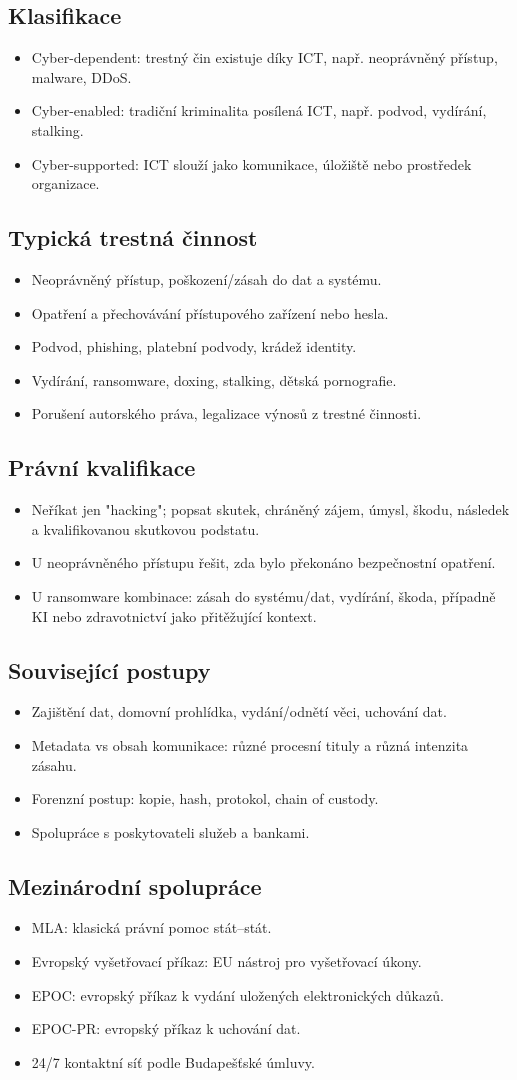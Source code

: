 \documentclass[10pt,a4paper]{article}
\newcommand{\blok}[1]{\subsection*{#1}}
\begin{document}
\blok{Klasifikace}
\begin{itemize}
  \item Cyber-dependent: trestný čin existuje díky ICT, např. neoprávněný přístup, malware, DDoS.
  \item Cyber-enabled: tradiční kriminalita posílená ICT, např. podvod, vydírání, stalking.
  \item Cyber-supported: ICT slouží jako komunikace, úložiště nebo prostředek organizace.
\end{itemize}

\blok{Typická trestná činnost}
\begin{itemize}
  \item Neoprávněný přístup, poškození/zásah do dat a systému.
  \item Opatření a přechovávání přístupového zařízení nebo hesla.
  \item Podvod, phishing, platební podvody, krádež identity.
  \item Vydírání, ransomware, doxing, stalking, dětská pornografie.
  \item Porušení autorského práva, legalizace výnosů z trestné činnosti.
\end{itemize}

\blok{Právní kvalifikace}
\begin{itemize}
  \item Neříkat jen "hacking"; popsat skutek, chráněný zájem, úmysl, škodu, následek a kvalifikovanou skutkovou podstatu.
  \item U neoprávněného přístupu řešit, zda bylo překonáno bezpečnostní opatření.
  \item U ransomware kombinace: zásah do systému/dat, vydírání, škoda, případně KI nebo zdravotnictví jako přitěžující kontext.
\end{itemize}

\blok{Související postupy}
\begin{itemize}
  \item Zajištění dat, domovní prohlídka, vydání/odnětí věci, uchování dat.
  \item Metadata vs obsah komunikace: různé procesní tituly a různá intenzita zásahu.
  \item Forenzní postup: kopie, hash, protokol, chain of custody.
  \item Spolupráce s poskytovateli služeb a bankami.
\end{itemize}

\blok{Mezinárodní spolupráce}
\begin{itemize}
  \item MLA: klasická právní pomoc stát--stát.
  \item Evropský vyšetřovací příkaz: EU nástroj pro vyšetřovací úkony.
  \item EPOC: evropský příkaz k vydání uložených elektronických důkazů.
  \item EPOC-PR: evropský příkaz k uchování dat.
  \item 24/7 kontaktní síť podle Budapešťské úmluvy.
\end{itemize}
\end{document}
